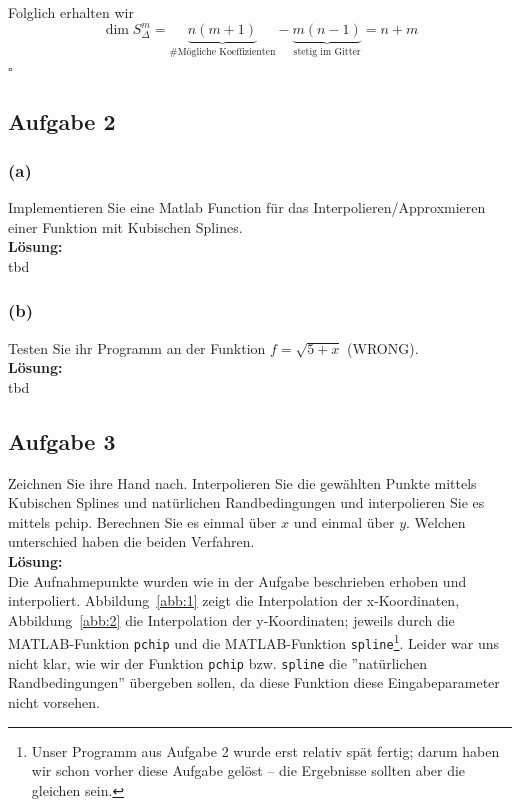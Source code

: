\documentclass[11pt,a4paper,ngerman]{article}
\begin{document}
Folglich erhalten wir
\begin{equation*}
    \dim S_\Delta^m = \underbrace{n(m+1)}_\text{\#Mögliche Koeffizienten} - \underbrace{m(n-1)}_\text{stetig im Gitter} = n + m
\end{equation*}
\mbox{}\hfill$\square$

\subsection*{Aufgabe 2}

\subsubsection*{(a)}

Implementieren Sie eine Matlab Function für das Interpolieren/Approxmieren einer Funktion mit Kubischen Splines.\\

\textbf{Lösung:}\\

tbd

\subsubsection*{(b)}

Testen Sie ihr Programm an der Funktion $f = \sqrt{5 + x}$ (WRONG).\\

\textbf{Lösung:}\\

tbd

\subsection*{Aufgabe 3}

Zeichnen Sie ihre Hand nach. Interpolieren Sie die gewählten Punkte mittels Kubischen Splines und natürlichen Randbedingungen
und interpolieren Sie es mittels pchip. Berechnen Sie es einmal über $x$ und einmal über $y$. Welchen unterschied
haben die beiden Verfahren.\\

\textbf{Lösung:}\\

Die Aufnahmepunkte wurden wie in der Aufgabe beschrieben erhoben und interpoliert. Abbildung~\ref{abb:1} zeigt die Interpolation der x-Koordinaten, Abbildung~\ref{abb:2} die Interpolation der y-Koordinaten; jeweils durch  die MATLAB-Funktion \texttt{pchip} und die MATLAB-Funktion \texttt{spline}\footnote{Unser Programm aus Aufgabe 2 wurde erst relativ spät fertig; darum haben wir schon vorher diese Aufgabe gelöst -- die Ergebnisse sollten aber die gleichen sein.}.
Leider war uns nicht klar, wie wir der Funktion \texttt{pchip} bzw. \texttt{spline} die ''natürlichen Randbedingungen'' übergeben sollen, da diese Funktion diese Eingabeparameter nicht vorsehen.
\end{document}
